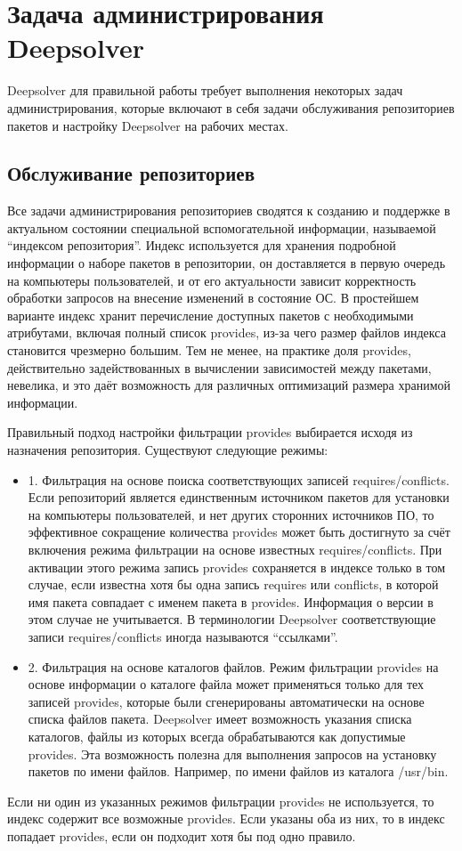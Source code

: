 \section{Задача администрирования Deepsolver}
Deepsolver для правильной работы требует выполнения некоторых задач 
администрирования, которые включают в себя задачи обслуживания репозиториев
 пакетов и настройку Deepsolver на рабочих местах.

\subsection{Обслуживание  репозиториев}
Все задачи администрирования репозиториев сводятся к созданию и поддержке в
актуальном состоянии специальной вспомогательной информации, называемой 
“индексом репозитория”. Индекс используется для хранения подробной информации 
о наборе пакетов в репозитории, он доставляется в первую очередь на компьютеры
пользователей, и от его актуальности зависит корректность обработки запросов 
на внесение изменений в состояние ОС. В простейшем варианте индекс
хранит перечисление доступных пакетов с необходимыми атрибутами, включая
полный список provides, из-за чего размер файлов индекса становится
чрезмерно большим. Тем не менее, на практике доля provides, действительно
задействованных в вычислении зависимостей между пакетами, невелика,
и это даёт возможность для различных оптимизаций размера хранимой информации.

Правильный подход настройки фильтрации provides выбирается исходя
из назначения репозитория. Существуют следующие режимы:
\begin{itemize}
\item{1. Фильтрация на основе поиска соответствующих записей requires/conflicts.
Если репозиторий является единственным источником пакетов для установки
на компьютеры пользователей, и нет других сторонних источников ПО, 
то эффективное сокращение количества provides может быть
достигнуто за счёт включения режима фильтрации на основе известных
requires/conflicts. При активации этого режима запись provides сохраняется
в индексе только в том случае, если известна хотя бы одна запись
requires или conflicts, в которой имя пакета совпадает с именем пакета
в provides. Информация о версии в этом случае не учитывается. В терминологии 
Deepsolver соответствующие записи requires/conflicts иногда называются “ссылками”.}
\item{2. Фильтрация на основе каталогов файлов. Режим фильтрации provides
на основе информации о каталоге файла может применяться только для
тех записей provides, которые были сгенерированы автоматически на основе
 списка файлов пакета. Deepsolver имеет возможность указания списка
каталогов, файлы из которых всегда обрабатываются как допустимые
provides. Эта возможность полезна для выполнения запросов на установку
 пакетов по имени файлов. Например, по имени файлов из каталога
/usr/bin.}
\end{itemize}
Если ни один из указанных режимов фильтрации provides не используется,
то индекс содержит все возможные provides. Если указаны оба из них, то
в индекс попадает provides, если он подходит хотя бы под одно правило.

